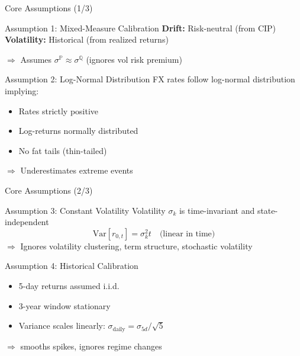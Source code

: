 \documentclass[11pt,aspectratio=169]{beamer}
\begin{document}
	\begin{frame}{Core Assumptions (1/3)}
		\begin{block}{Assumption 1: Mixed-Measure Calibration}
			\textbf{Drift:} Risk-neutral (from CIP) \\
			\textbf{Volatility:} Historical (from realized returns)
			
			\textcolor{mufgred}{$\Rightarrow$ Assumes $\sigma^{\mathbb{P}} \approx \sigma^{\mathbb{Q}}$ (ignores vol risk premium)}
		\end{block}
		
		\vspace{0.2cm}
		
		\begin{block}{Assumption 2: Log-Normal Distribution}
			FX rates follow log-normal distribution implying:
			\begin{itemize}
				\item Rates strictly positive
				\item Log-returns normally distributed
				\item No fat tails (thin-tailed)
			\end{itemize}
			\textcolor{mufgred}{$\Rightarrow$ Underestimates extreme events}
		\end{block}
	\end{frame}
	
	\begin{frame}{Core Assumptions (2/3)}
		\begin{block}{Assumption 3: Constant Volatility}
			Volatility $\sigma_k$ is time-invariant and state-independent
			\begin{equation*}
				\text{Var}[r_{0,t}] = \sigma_k^2 t \quad \text{(linear in time)}
			\end{equation*}
			\textcolor{mufgred}{$\Rightarrow$ Ignores volatility clustering, term structure, stochastic volatility}
		\end{block}
		
		\vspace{0.2cm}
		
		\begin{block}{Assumption 4: Historical Calibration}
			\begin{itemize}
				\item 5-day returns assumed i.i.d.
				\item 3-year window stationary
				\item Variance scales linearly: $\sigma_{\text{daily}} = \sigma_{5d}/\sqrt{5}$
			\end{itemize}
			\textcolor{mufgred}{$\Rightarrow$ smooths spikes, ignores regime changes}
		\end{block}
	\end{frame}
	
\end{document}

